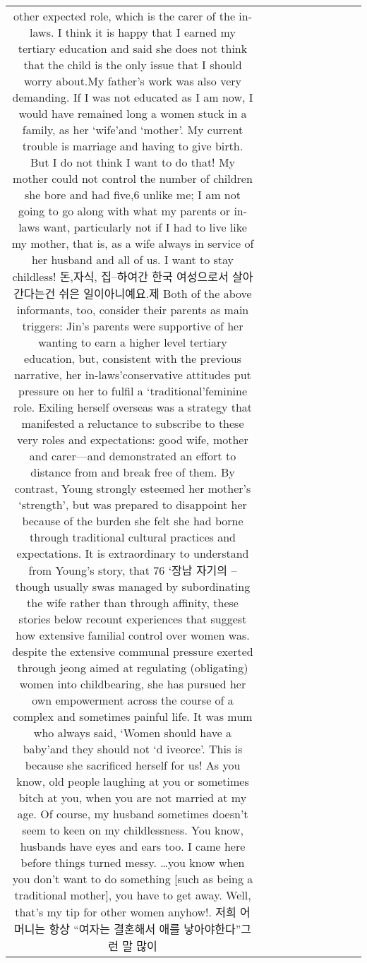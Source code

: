 \begin{table}[h!]
\begin{tabular}{|c|c|c|c|c|c|c|c|c|c|}
{other expected role, which is the carer of the in-laws. I think it is happy that I earned my tertiary education and said she does not think that the child is the only issue that I should worry about.My father's work was also very demanding. If I was not
educated as I am now, I would have remained long a women stuck in a family,
as her ‘wife’and ‘mother’. My current trouble is marriage and having to give birth.
But I do not think I want to do that! My mother could not control the number of
children she bore and had five,6 unlike me; I am not going to go along with what my
parents or in-laws want, particularly not if I had to live like my mother, that is, as
a wife always in service of her husband and all of us. I want to stay childless! 돈,자식, 집–하여간 한국 여성으로서 살아간다는건 쉬은 일이아니예요.제
Both of the above informants, too, consider their parents as main triggers: Jin’s parents were supportive of her wanting to earn a higher level tertiary education, but, consistent with the previous narrative, her in-laws’conservative attitudes put pressure on her to fulfil a ‘traditional’feminine role. Exiling herself overseas was a strategy that manifested a reluctance to subscribe to these very roles and expectations: good wife, mother and carer—and demonstrated an effort to distance from and break free of them.
By contrast, Young strongly esteemed her mother’s ‘strength’, but was prepared to disappoint her because of the burden she felt she had borne through traditional cultural practices and expectations. It is extraordinary to understand from Young’s story, that
76 ‘장남 자기의 – though usually swas managed by subordinating the wife rather than through affinity, these stories below recount experiences that suggest how extensive familial control over women was.
despite the extensive communal pressure exerted through jeong aimed at regulating (obligating) women into childbearing, she has pursued her own empowerment across the course of a complex and sometimes painful life.
It was mum who always said, ‘Women should have a baby’and they should not ‘d iveorce’. This is because she sacrificed herself for us! As you know, old people laughing at you or sometimes bitch at you, when you are not married at my age. Of course, my husband sometimes doesn’t seem to keen on my
childlessness. You know, husbands have eyes and ears too. I came here before things turned messy. …you know when you don’t want to do something [such as being a traditional mother], you have to get away. Well, that’s my tip for other women anyhow!. 저희 어머니는 항상 “여자는 결혼해서 애를 낳아야한다”그런 말 많이
}
\end{tabular}
\end{table}
